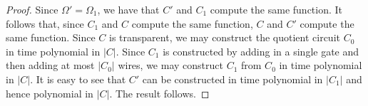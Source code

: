 \documentclass[../paper.tex]{subfiles}
\begin{document}
\begin{proof}
  Since $\Omega' = \Omega_1$, we have that $C'$ and $C_1$ compute the same
  function. It follows that, since $C_1$ and $C$ compute the same function, $C$
  and $C'$ compute the same function. Since $C$ is transparent, we may construct
  the quotient circuit $C_0$ in time polynomial in $\vert C \vert$. Since $C_1$
  is constructed by adding in a single gate and then adding at most $\vert C_0
  \vert$ wires, we may construct $C_1$ from $C_0$ in time polynomial in $\vert C
  \vert$. It is easy to see that $C'$ can be constructed in time polynomial
  in $\vert C_1 \vert$ and hence polynomial in $\vert C \vert$. The result
  follows.



\end{proof}
\end{document}
